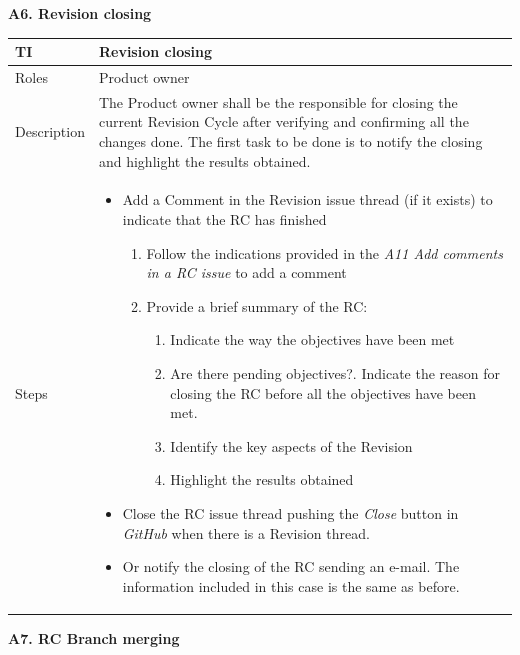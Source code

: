 \documentclass{template/openetcs_article}
\begin{document}
\textbf{A6. Revision closing}

\begin{flushleft}
\tablefirsthead{}
\tablehead{}
\tabletail{}
\tablelasttail{}
\begin{supertabular}{|m{2cm}|m{13cm}|}
\hline
{}
TI & 
Revision closing
\\\hline
Roles &
Product owner
\\\hline
Description &
The Product owner shall be the responsible for closing the current Revision Cycle after verifying and confirming all the changes done. The first task to be done is to notify the closing and highlight the results obtained.
\\\hline
Steps &
\begin{itemize}
\item Add a Comment in the Revision issue thread (if it exists) to indicate that the RC has finished
\begin{enumerate}
\item Follow the indications provided in the {\it A11 Add comments in a RC issue} to add a comment
\item Provide a brief summary of the RC:
\begin{enumerate}
\item Indicate the way the objectives have been met 
\item Are there pending objectives?. Indicate the reason for closing the RC before all the objectives have been met.
\item Identify the key aspects of the Revision
\item Highlight the results obtained
\end{enumerate}
\end{enumerate}
\item Close the RC issue thread pushing the {\it Close} button in {\it GitHub} when there is a Revision thread.
\item Or notify the closing of the RC sending an e-mail. The information included in this case is the same as before.
\end{itemize}
\\\hline
\end{supertabular}
\end{flushleft}

\textbf{A7. RC Branch merging}
\end{document}
